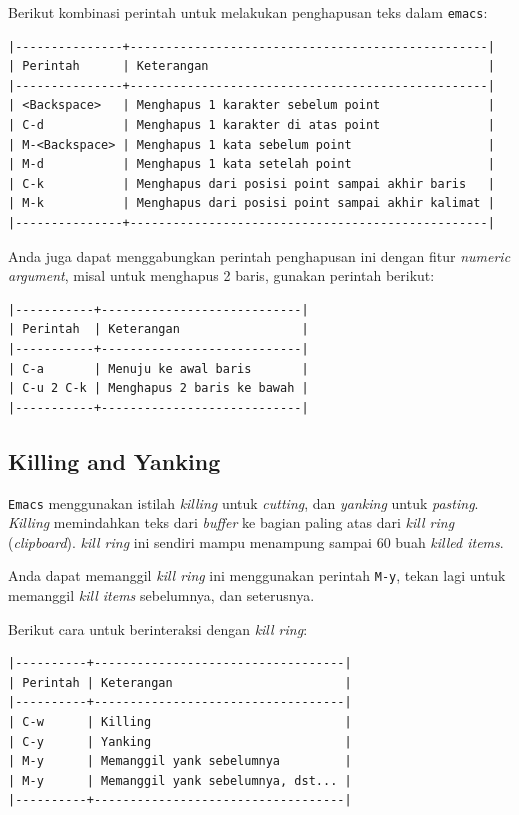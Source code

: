 \documentclass{article}
\begin{document}
Berikut kombinasi perintah untuk melakukan penghapusan teks dalam \verb=emacs=:

\begin{verbatim}
|---------------+--------------------------------------------------|
| Perintah      | Keterangan                                       |
|---------------+--------------------------------------------------|
| <Backspace>   | Menghapus 1 karakter sebelum point               |
| C-d           | Menghapus 1 karakter di atas point               |
| M-<Backspace> | Menghapus 1 kata sebelum point                   |
| M-d           | Menghapus 1 kata setelah point                   |
| C-k           | Menghapus dari posisi point sampai akhir baris   |
| M-k           | Menghapus dari posisi point sampai akhir kalimat |
|---------------+--------------------------------------------------|
\end{verbatim}

Anda juga dapat menggabungkan perintah penghapusan ini dengan fitur
\emph{numeric argument}, misal untuk menghapus 2 baris, gunakan perintah 
berikut:

\begin{verbatim}
|-----------+----------------------------|
| Perintah  | Keterangan                 |
|-----------+----------------------------|
| C-a       | Menuju ke awal baris       |
| C-u 2 C-k | Menghapus 2 baris ke bawah |
|-----------+----------------------------|
\end{verbatim}

\subsection{Killing and Yanking}
\verb=Emacs= menggunakan istilah \emph{killing} untuk \emph{cutting}, dan
\emph{yanking} untuk \emph{pasting}. \emph{Killing} memindahkan teks dari
\emph{buffer} ke bagian paling atas dari \emph{kill ring} (\emph{clipboard}).
\emph{kill ring} ini sendiri mampu menampung sampai 60 buah \emph{killed items}.

Anda dapat memanggil \emph{kill ring} ini menggunakan perintah \verb=M-y=, 
tekan lagi untuk memanggil \emph{kill items} sebelumnya, dan seterusnya.

Berikut cara untuk berinteraksi dengan \emph{kill ring}:

\begin{verbatim}
|----------+-----------------------------------|
| Perintah | Keterangan                        |
|----------+-----------------------------------|
| C-w      | Killing                           |
| C-y      | Yanking                           |
| M-y      | Memanggil yank sebelumnya         |
| M-y      | Memanggil yank sebelumnya, dst... |
|----------+-----------------------------------|
\end{verbatim}
\end{document}
